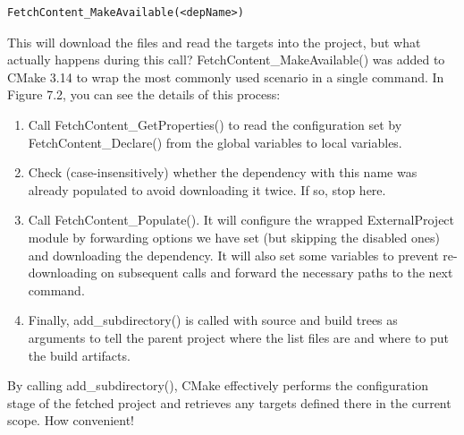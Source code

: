 \begin{lstlisting}[style=styleCMake]
FetchContent_MakeAvailable(<depName>)
\end{lstlisting} 

This will download the files and read the targets into the project, but what actually happens during this call? FetchContent\_MakeAvailable() was added to CMake 3.14 to wrap the most commonly used scenario in a single command. In Figure 7.2, you can see the details of this process:

\begin{enumerate}
\item 
Call FetchContent\_GetProperties() to read the configuration set by FetchContent\_Declare() from the global variables to local variables.

\item 
Check (case-insensitively) whether the dependency with this name was already populated to avoid downloading it twice. If so, stop here.

\item 
Call FetchContent\_Populate(). It will configure the wrapped ExternalProject module by forwarding options we have set (but skipping the disabled ones) and downloading the dependency. It will also set some variables to prevent re-downloading on subsequent calls and forward the necessary paths to the next command.

\item 
Finally, add\_subdirectory() is called with source and build trees as arguments to tell the parent project where the list files are and where to put the build artifacts.
\end{enumerate}

By calling add\_subdirectory(), CMake effectively performs the configuration stage of the fetched project and retrieves any targets defined there in the current scope. How convenient!

